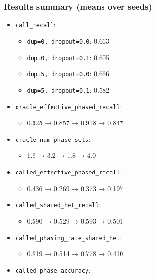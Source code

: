 \documentclass[
]{article}
\providecommand{\tightlist}{%
  \setlength{\itemsep}{0pt}\setlength{\parskip}{0pt}}
\begin{document}
\subsubsection{Results summary (means over
seeds)}\label{results-summary-means-over-seeds-6}

\begin{itemize}
\tightlist
\item
  \texttt{call\_recall}:

  \begin{itemize}
  \tightlist
  \item
    \texttt{dup=0,\ dropout=0.0}: 0.663
  \item
    \texttt{dup=0,\ dropout=0.1}: 0.605
  \item
    \texttt{dup=5,\ dropout=0.0}: 0.666
  \item
    \texttt{dup=5,\ dropout=0.1}: 0.582
  \end{itemize}
\item
  \texttt{oracle\_effective\_phased\_recall}:

  \begin{itemize}
  \tightlist
  \item
    0.925 → 0.857 → 0.918 → 0.847
  \end{itemize}
\item
  \texttt{oracle\_num\_phase\_sets}:

  \begin{itemize}
  \tightlist
  \item
    1.8 → 3.2 → 1.8 → 4.0
  \end{itemize}
\item
  \texttt{called\_effective\_phased\_recall}:

  \begin{itemize}
  \tightlist
  \item
    0.436 → 0.269 → 0.373 → 0.197
  \end{itemize}
\item
  \texttt{called\_shared\_het\_recall}:

  \begin{itemize}
  \tightlist
  \item
    0.590 → 0.529 → 0.593 → 0.501
  \end{itemize}
\item
  \texttt{called\_phasing\_rate\_shared\_het}:

  \begin{itemize}
  \tightlist
  \item
    0.819 → 0.514 → 0.778 → 0.410
  \end{itemize}
\item
  \texttt{called\_phase\_accuracy}:


\end{itemize}
\end{document}
